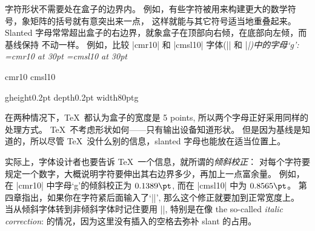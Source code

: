 字符形状不需要处在盒子的边界内。%
例如，有些字符被用来构建更大的数学符号，象矩阵的括号就有意突出来一点，
这样就能与其它符号适当地重叠起来。%
Slanted 字母常常超出盒子的右边界，就象盒子在顶部向右倾，在底部向左倾，而基线保持%
不动一样。%
例如，比较 |cmr10| 和 |cmsl10| 字体(|\rm| 和 |\sl|)中的字母`g':
\medskip
\font\cmrgg=cmr10 at 30pt
\font\cmslgg=cmsl10 at 30pt
\centerline{cmr10 \hskip 30pt cmsl10}
\smallskip
\centerline{{\vrule\cmrgg g\vrule\hskip-16pt\vrule height0.2pt depth0.2pt
width80pt\hskip-16pt\vrule\cmslgg g\vrule}}
\medskip
\noindent
在两种情况下，\TeX\ 都认为盒子的宽度是 5 points, 所以两个字母正好采用同样的处理方式。%
\TeX\ 不考虑形状如何——只有输出设备知道形状。%
但是因为基线是知道的，所以尽管 \TeX\ 没什么别的信息，slanted 字母也能放在适当位置上。

\1实际上，字体设计者也要告诉 \TeX\ 一个信息，就所谓的{\sl 倾斜校正}：
对每个字符要规定一个数字，大概说明字符要伸出其右边界多少，再加上一点富余量。%
例如，在 |cmr10| 中字母`g'的倾斜校正为 $0.1389\pt$, 而在 |cmsl10| 中为 $0.8565\pt$。%
第四章指出，如果你在字符紧后面输入了`|\/|', 那么这个修正就要加到正常宽度上。%
当从倾斜字体转到非倾斜字体时记住要用 |\/|, 特别是在像
\begintt
the so-called {\sl italic correction\/}:
\endtt
的情况，因为这里没有插入的空格去弥补 slant 的占用。

